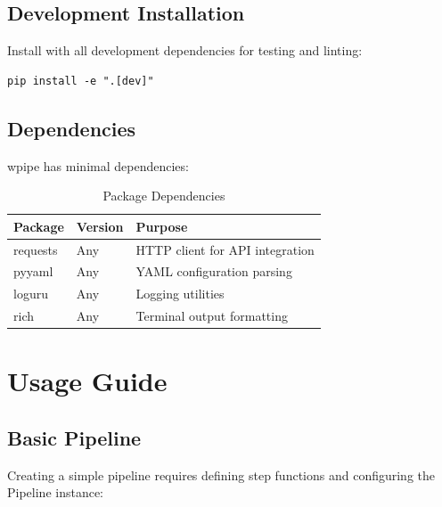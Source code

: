 \documentclass[12pt,a4paper]{report}
\begin{document}
\section{Development Installation}

Install with all development dependencies for testing and linting:

\begin{lstlisting}[caption={Development Installation}, label={lst:dev-install}]
pip install -e ".[dev]"
\end{lstlisting}

\section{Dependencies}

wpipe has minimal dependencies:

\begin{table}[H]
    \centering
    \caption{Package Dependencies}
    \label{tab:deps-pkg}
    \begin{tabular}{lll}
        \toprule
        \textbf{Package} & \textbf{Version} & \textbf{Purpose} \\
        \midrule
        requests & Any & HTTP client for API integration \\
        pyyaml & Any & YAML configuration parsing \\
        loguru & Any & Logging utilities \\
        rich & Any & Terminal output formatting \\
        \bottomrule
    \end{tabular}
\end{table}

\chapter{Usage Guide}
\cleardoublepage

\section{Basic Pipeline}

Creating a simple pipeline requires defining step functions and configuring the Pipeline instance:
\end{document}
